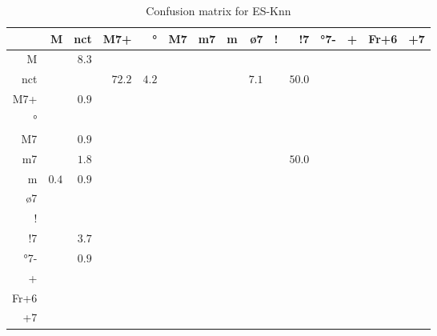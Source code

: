 \documentclass{article}
\begin{document}
\begin{table}
\begin{center}
\begin{tabular}{r|r|r|r|r|r|r|r|r|r|r|r|r|r|r}
       & M & nct & M7+ & ° & M7 & m7 & m & ø7 & ! & !7 & °7- & + & Fr+6 & +7 \\ \hline
 M & $ $ & $8.3$ & $ $ & $ $ & $ $ & $ $ & $ $ & $ $ & $ $ & $ $ & $ $ & $ $ & $ $ & $ $  \\ \hline
 nct & $ $ & $ $ & $72.2$ & $4.2$ & $ $ & $ $ & $ $ & $7.1$ & $ $ & $50.0$ & $ $ & $ $ & $ $ & $ $  \\ \hline
 M7+ & $ $ & $0.9$ & $ $ & $ $ & $ $ & $ $ & $ $ & $ $ & $ $ & $ $ & $ $ & $ $ & $ $ & $ $  \\ \hline
 ° & $ $ & $ $ & $ $ & $ $ & $ $ & $ $ & $ $ & $ $ & $ $ & $ $ & $ $ & $ $ & $ $ & $ $  \\ \hline
 M7 & $ $ & $0.9$ & $ $ & $ $ & $ $ & $ $ & $ $ & $ $ & $ $ & $ $ & $ $ & $ $ & $ $ & $ $  \\ \hline
 m7 & $ $ & $1.8$ & $ $ & $ $ & $ $ & $ $ & $ $ & $ $ & $ $ & $50.0$ & $ $ & $ $ & $ $ & $ $  \\ \hline
 m & $0.4$ & $0.9$ & $ $ & $ $ & $ $ & $ $ & $ $ & $ $ & $ $ & $ $ & $ $ & $ $ & $ $ & $ $  \\ \hline
 ø7 & $ $ & $ $ & $ $ & $ $ & $ $ & $ $ & $ $ & $ $ & $ $ & $ $ & $ $ & $ $ & $ $ & $ $  \\ \hline
 ! & $ $ & $ $ & $ $ & $ $ & $ $ & $ $ & $ $ & $ $ & $ $ & $ $ & $ $ & $ $ & $ $ & $ $  \\ \hline
 !7 & $ $ & $3.7$ & $ $ & $ $ & $ $ & $ $ & $ $ & $ $ & $ $ & $ $ & $ $ & $ $ & $ $ & $ $  \\ \hline
 °7- & $ $ & $0.9$ & $ $ & $ $ & $ $ & $ $ & $ $ & $ $ & $ $ & $ $ & $ $ & $ $ & $ $ & $ $  \\ \hline
 + & $ $ & $ $ & $ $ & $ $ & $ $ & $ $ & $ $ & $ $ & $ $ & $ $ & $ $ & $ $ & $ $ & $ $  \\ \hline
 Fr+6 & $ $ & $ $ & $ $ & $ $ & $ $ & $ $ & $ $ & $ $ & $ $ & $ $ & $ $ & $ $ & $ $ & $ $  \\ \hline
 +7 & $ $ & $ $ & $ $ & $ $ & $ $ & $ $ & $ $ & $ $ & $ $ & $ $ & $ $ & $ $ & $ $ & $ $  \\ \hline
\end{tabular}
\caption{Confusion matrix for ES-Knn}
\end{center}
\end{table}
\end{document}
